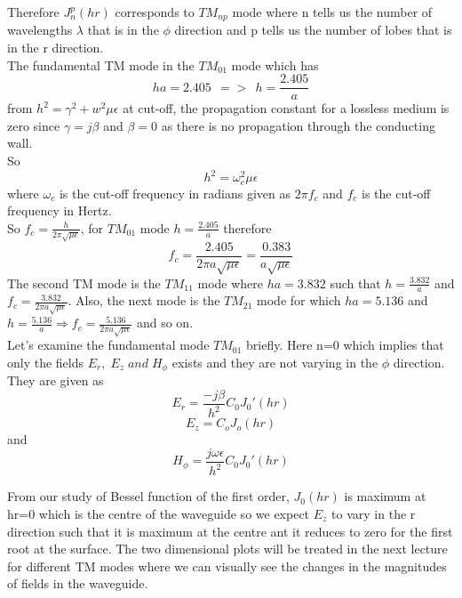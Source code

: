       Therefore $J_n^p(hr)$ corresponds to $TM_{np}$ mode where n tells us the number of wavelengths $\lambda$ that is in the $\phi$ direction and p tells us the number of lobes that is in the r direction.
      \\ The fundamental TM mode in the $TM_{01}$ mode which has 
      $$
         ha = 2.405 \ \ => \ \ h=\frac{2.405}{a}
      $$
      from $h^2=\gamma^2+w^2\mu\epsilon $ at cut-off, the propagation constant for a lossless medium is zero since $\gamma=j\beta$ and $\beta=0$ as there is no propagation through the conducting wall. 
      \\ So
      $$
        h^2=\omega_c^2\mu\epsilon
      $$ where $\omega_c$ is the cut-off frequency in radians given as $2\pi f_c$ and $f_c$ is the cut-off frequency in Hertz.
      \\So $f_c =\frac{h}{2\pi\sqrt{\mu\epsilon}}$, for $TM_{01}$ mode $h=\frac{2.405}{a}$ therefore 
      $$
      f_c=\frac{2.405}{2\pi a\sqrt{\mu\epsilon}} =\frac{0.383}{a\sqrt{\mu\epsilon}}
      $$
      The second TM mode is the $TM_{11}$ mode where $ha =3.832$ such that $h=\frac{3.832}{a}$ and $f_c=\frac{3.832}{2\pi a\sqrt{\mu\epsilon}}$. Also, the next mode is the $TM_{21}$ mode for which $ha =5.136$ and $h=\frac{5.136}{a} \Longrightarrow f_c=\frac{5.136}{2\pi a \sqrt{\mu\epsilon}}$ and so on. \\
      Let's examine the fundamental mode $TM_{01}$ briefly. Here n=0 which implies that only the fields $E_r, \; E_z \; and \; H_\phi$ exists and they are not varying in the $\phi$ direction. They are given as
      $$
        E_r=\frac{-j\beta}{h^2}C_0J_0'(hr)
      $$
      $$
        E_z=C_oJ_o(hr)
      $$
      and
      $$
        H_\phi=\frac{j\omega\epsilon}{h^2}C_0J_0'(hr)
      $$
      
      From our study of Bessel function of the first order, $J_0(hr)$ is maximum at hr=0 which is the centre of the waveguide so we expect $E_z$ to vary in the r direction such that it is maximum at the centre ant it reduces to zero for the first root at the surface. The two dimensional plots will be treated in the next lecture for different TM modes where we can visually see the changes in the magnitudes of fields in the waveguide.
